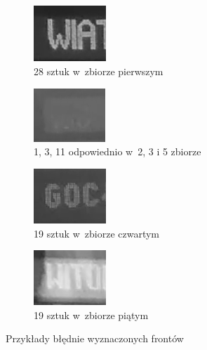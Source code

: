 \begin{figure}[h!]\centering
	\begin{subfigure}{.4\linewidth}
		\centering
		\includegraphics[width=0.3\textwidth]{img/5sessions/01-numwrong-01}
		\caption{28 sztuk w~zbiorze pierwszym}
	\end{subfigure}
	\hfill	
	\begin{subfigure}{.4\linewidth}
		\centering
		\includegraphics[width=.3\textwidth]{img/5sessions/02-numwrong-01}
		\caption{1, 3, 11 odpowiednio w~2, 3 i 5 zbiorze}
	\end{subfigure}
	\hfill	
	\begin{subfigure}{.4\linewidth}
		\centering
		\includegraphics[width=0.3\textwidth]{img/5sessions/04-numwrong-01}
		\caption{19 sztuk w~zbiorze czwartym}
	\end{subfigure}
	\hfill	
	\begin{subfigure}{.4\linewidth}
		\centering
		\includegraphics[width=0.3\textwidth]{img/5sessions/03-numwrong-01}
		\caption{19 sztuk w~zbiorze piątym}
	\end{subfigure}
	\caption{Przykłady błędnie wyznaczonych frontów}
	\label{fig:5usecasesNumberErrorSamples}
\end{figure}


